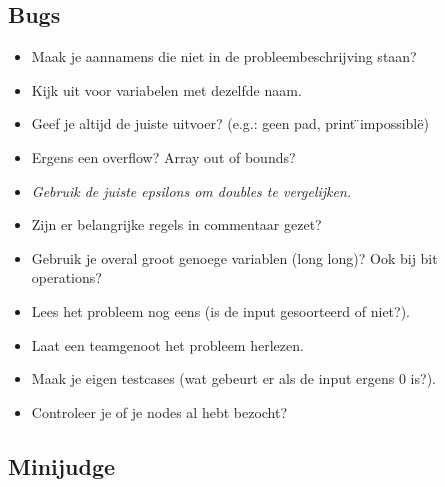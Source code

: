 \documentclass[10pt,a4paper,titlepage]{article}
\begin{document}
\subsection{Bugs}
\begin{multicols}{2}
\begin{itemize}[noitemsep,nolistsep]
\item Maak je aannamens die niet in de probleembeschrijving staan?
\item Kijk uit voor variabelen met dezelfde naam.
\item Geef je altijd de juiste uitvoer? (e.g.: geen pad, print \"{}impossible\"{})
\item Ergens een overflow? Array out of bounds?
\item \emph{Gebruik de juiste epsilons om doubles te vergelijken.}
\item Zijn er belangrijke regels in commentaar gezet?%
\item Gebruik je overal groot genoege variablen (long long)? Ook bij bit operations?
\item Lees het probleem nog eens (is de input gesoorteerd of niet?).
\item Laat een teamgenoot het probleem herlezen.
\item Maak je eigen testcases (wat gebeurt er als de input ergens 0 is?).
\item Controleer je of je nodes al hebt bezocht? 
\end{itemize}

\end{multicols}

\subsection{Minijudge}


\end{document}
